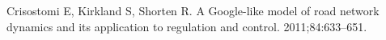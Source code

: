 \documentclass[twoside,twocolumn]{article}
\begin{document}
\begin{thebibliography}{99} %

Crisostomi E, Kirkland S, Shorten R. 
\newblock A Google-like model of road network dynamics and its application to regulation and control.
 2011;84:633--651.
 
\end{thebibliography}

\end{document}
